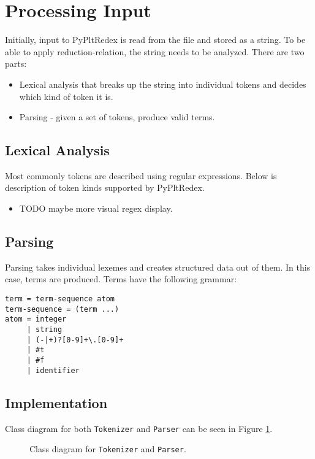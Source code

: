 \section{Processing Input}

Initially, input to PyPltRedex is read from the file and stored as a string. To be able to apply reduction-relation, the string needs to be analyzed. There are two parts:

\begin{itemize}
\item
Lexical analysis that breaks up the string into individual tokens and decides which kind of token it is.
\item
Parsing - given a set of tokens, produce valid terms.
\end{itemize}


\subsection{Lexical Analysis}

Most commonly tokens are described using regular expressions. Below is description of token kinds supported by PyPltRedex.
\begin{itemize}
\item
	TODO maybe more visual regex display.
\end{itemize}

\subsection{Parsing}

Parsing takes individual lexemes and creates structured data out of them. In this case, terms are produced. Terms have the following grammar:

\begin{lstlisting}
term = term-sequence atom
term-sequence = (term ...) 
atom = integer 
	 | string
	 | (-|+)?[0-9]+\.[0-9]+
	 | #t
	 | #f
	 | identifier
\end{lstlisting}


\subsection{Implementation}
Class diagram for both \texttt{Tokenizer} and \texttt{Parser} can be seen in Figure \ref{class-diagram-lexer-parser}.

\begin{figure}[h]
	\centering
\caption{Class diagram for \texttt{Tokenizer} and \texttt{Parser}.}
\label{class-diagram-lexer-parser}
\end{figure}

